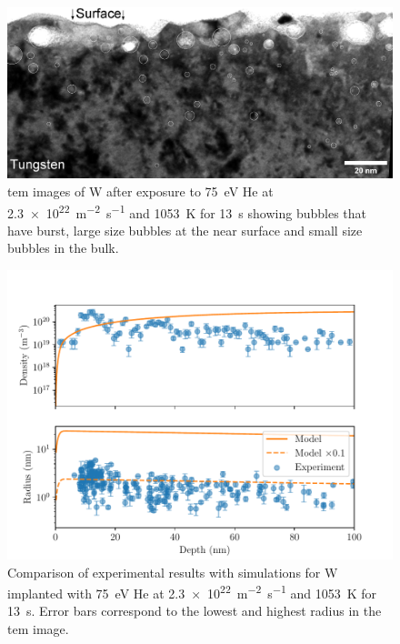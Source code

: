 \begin{figure} [h]
    \centering
    \includegraphics[width=\linewidth]{Figures/Chapter4/bubbles_tem.jpg}
    \caption{\gls{tem} images of W after exposure to \SI{75}{eV} He at \SI{2.3e22}{m^{-2}.s^{-1}} and \SI{1053}{K} for \SI{13}{s} showing bubbles that have burst, large size bubbles at the near surface and small size bubbles in the bulk.}
\end{figure}

\begin{figure} [h!]
    \centering
    \includegraphics[width=\linewidth]{Figures/Chapter4/comparison_model_exp.pdf}
    \caption{Comparison of experimental results with simulations for W implanted with \SI{75}{eV} He at \SI{2.3e22}{m^{-2}.s^{-1}} and \SI{1053}{K} for \SI{13}{s}. Error bars correspond to the lowest and highest radius in the \gls{tem} image.}
\end{figure}


